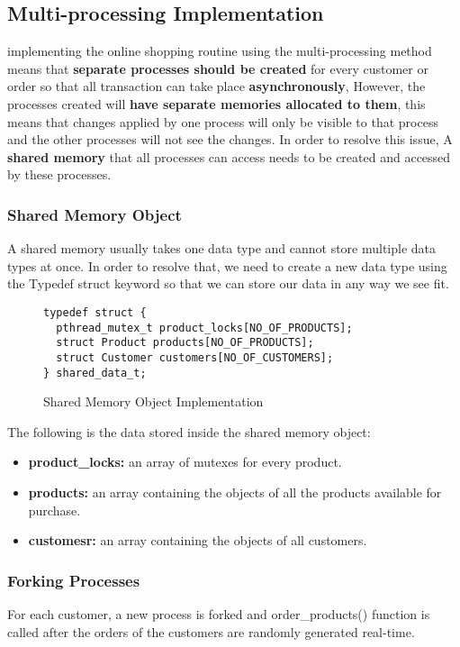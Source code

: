 \documentclass[pdftex,12pt,a4paper]{article}
\begin{document}
\subsection{Multi-processing Implementation}
implementing the online shopping routine using the multi-processing method means that \textbf{separate processes should be created} for every customer or order so that all transaction can take place \textbf{asynchronously}, However, the processes created will \textbf{have separate memories allocated to them}, this means that changes applied by one process will only be visible to that process and the other processes will not see the changes. In order to resolve this issue, A \textbf{shared memory} that all processes can access needs to be created and accessed by these processes.

\subsubsection{Shared Memory Object}
A shared memory usually takes one data type and cannot store multiple data types at once. In order to resolve that, we need to create a new data type using the Typedef struct keyword so that we can store our data in any way we see fit.
\begin{figure}[H]
\centering
\begin{lstlisting}
typedef struct {
  pthread_mutex_t product_locks[NO_OF_PRODUCTS];
  struct Product products[NO_OF_PRODUCTS];
  struct Customer customers[NO_OF_CUSTOMERS];
} shared_data_t;
\end{lstlisting}
\label{fig:shared_mem_struct}
\caption{Shared Memory Object Implementation}
\end{figure}
The following is the data stored inside the shared memory object:
\begin{itemize}
\item \textbf{product\_locks:} an array of mutexes for every product.
\item \textbf{products:} an array containing the objects of all the products available for purchase.
\item \textbf{customesr:} an array containing the objects of all customers.
\end{itemize}

\subsubsection{Forking Processes}
For each customer, a new process is forked and order\_products() function is called after the orders of the customers are randomly generated real-time.
\end{document}
